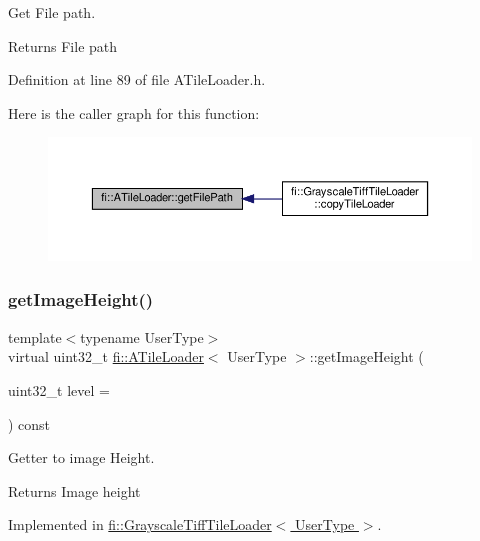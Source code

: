 Get File path. 

\begin{DoxyReturn}{Returns}
File path 
\end{DoxyReturn}


Definition at line 89 of file A\+Tile\+Loader.\+h.

Here is the caller graph for this function\+:
\nopagebreak
\begin{figure}[H]
\begin{center}
\leavevmode
\includegraphics[width=350pt]{dc/d54/classfi_1_1ATileLoader_a5efe3a55a89531b4ef657e58e5753340_icgraph}
\end{center}
\end{figure}
\mbox{\label{classfi_1_1ATileLoader_a53fb257d3ec8f3fa3d5f6c58de859000}} 
\subsubsection{\texorpdfstring{get\+Image\+Height()}{getImageHeight()}}
{\footnotesize\ttfamily template$<$typename User\+Type$>$ \\
virtual uint32\+\_\+t \hyperlink{classfi_1_1ATileLoader}{fi\+::\+A\+Tile\+Loader}$<$ User\+Type $>$\+::get\+Image\+Height (\begin{DoxyParamCaption}\item[{uint32\+\_\+t}]{level = {} }\end{DoxyParamCaption}) const\hspace{0.3cm}{\ttfamily [pure virtual]}}



Getter to image Height. 

\begin{DoxyReturn}{Returns}
Image height 
\end{DoxyReturn}


Implemented in \hyperlink{classfi_1_1GrayscaleTiffTileLoader_aedb905b521b888c68a59d20695c33e51}{fi\+::\+Grayscale\+Tiff\+Tile\+Loader$<$ User\+Type $>$}.

